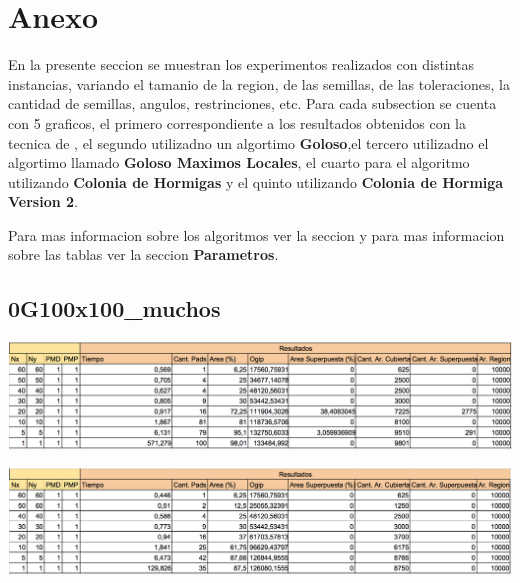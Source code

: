 \newpage
\section{Anexo}

En la presente seccion se muestran  los experimentos realizados con distintas instancias, variando el tamanio de la region, de las semillas, de las toleraciones, la cantidad de semillas, angulos, restrinciones, etc.
Para cada subsection se cuenta con 5 graficos, el primero correspondiente a los resultados obtenidos con la tecnica de , el segundo utilizadno un algortimo \textbf{Goloso},el tercero utilizadno el algortimo llamado \textbf{Goloso Maximos Locales}, el cuarto para el algoritmo utilizando \textbf{Colonia de Hormigas} y el quinto utilizando \textbf{Colonia de Hormiga Version 2}. 

Para mas informacion sobre los algoritmos ver la seccion  y para mas informacion sobre las tablas ver la seccion \textbf{Parametros}.
\subsection{0G100x100\_muchos}

\begin{center}
\includegraphics[width=1\textwidth]{imagenes/S_0G100x100_muchos}
\end{center}

\begin{center}
\includegraphics[width=1\textwidth]{imagenes/G_0G100x100_muchos}
\end{center}

